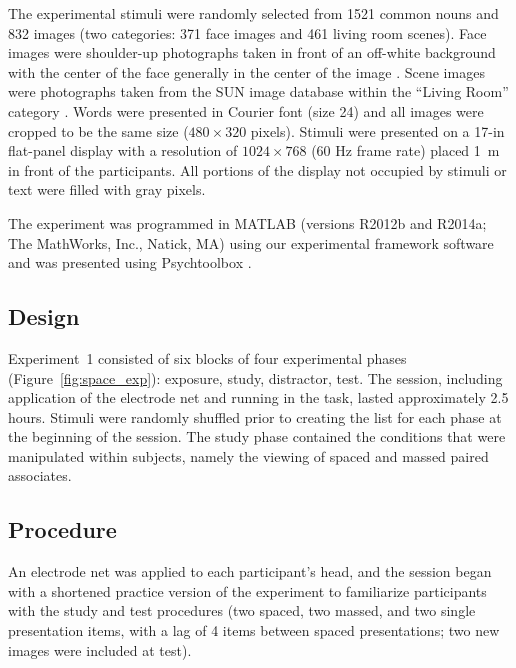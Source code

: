 The experimental stimuli were randomly selected from 1521 common nouns \cite{PEERSwordpool}
and 832 images (two categories: 371 face images and 461 living room scenes).  Face images were shoulder-up photographs taken in front of an off-white background with the center of the face generally in the center of the image \cite{PhilEtal2000}.  Scene images were photographs taken from the SUN image database within the ``Living Room'' category \cite{XiaoEtal2010}.  Words were presented in Courier font (size 24) and all images were cropped to be the same size ($480\times320$ pixels).  Stimuli were presented on a 17-in flat-panel display with a resolution of $1024\times768$ (60 Hz frame rate) placed 1~m in front of the participants.  All portions of the display not occupied by stimuli or text were filled with gray pixels.



The experiment was programmed in MATLAB (versions R2012b and R2014a; The MathWorks, Inc., Natick, MA) using our experimental framework software \cite{expertTrain}
and was presented using Psychtoolbox \cite{Brai1997}.

\subsection{Design}

Experiment~1 consisted of six blocks of four experimental phases (Figure~\ref{fig:space_exp}): exposure, study, distractor, test.  The session, including application of the electrode net and running in the task, lasted approximately 2.5 hours.  Stimuli were randomly shuffled prior to creating the list for each phase at the beginning of the session.  The study phase contained the conditions that were manipulated within subjects, namely the viewing of spaced and massed paired associates.

\subsection{Procedure}

An electrode net was applied to each participant's head, and the session began with a shortened practice version of the experiment to familiarize participants with the study and test procedures (two spaced, two massed, and two single presentation items, with a lag of 4 items between spaced presentations; two new images were included at test).

